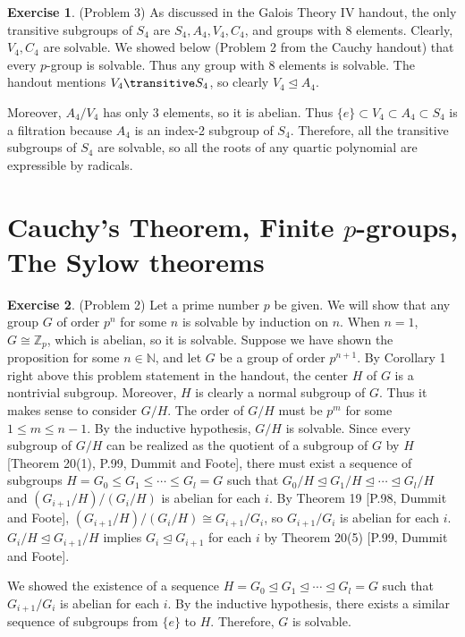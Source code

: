 \documentclass[12pt, psamsfonts]{amsart}
\theoremstyle{definition}
\newtheorem*{exer}{Exercise}
\theoremstyle{remark}
\numberwithin{equation}{section}
\begin{document}
\begin{exer}{(Problem 3)}
  As discussed in the Galois Theory IV handout, the only transitive subgroups of $S_4$ are $S_4, A_4, V_4, C_4$, and groups with 8 elements.
  Clearly, $V_4, C_4$ are solvable.
  We showed below (Problem 2 from the Cauchy handout) that every $p$-group is solvable.
  Thus any group with 8 elements is solvable.
  The handout mentions $V_4 \transitive S_4$, so clearly $V_4 \trianglelefteq A_4$.

  Moreover, $A_4 / V_4$ has only 3 elements, so it is abelian.
  Thus $\{ e \} \subset V_4 \subset A_4 \subset S_4$ is a filtration because $A_4$ is an index-2 subgroup of $S_4$.
  Therefore, all the transitive subgroups of $S_4$ are solvable, so all the roots of any quartic polynomial are expressible by radicals.
\end{exer}

\section{Cauchy's Theorem, Finite $p$-groups, The Sylow theorems}

\begin{exer}{(Problem 2)}
  Let a prime number $p$ be given.
  We will show that any group $G$ of order $p^n$ for some $n$ is solvable by induction on $n$.
  When $n = 1$, $G \cong \mathbb{Z}_p$, which is abelian, so it is solvable.
  Suppose we have shown the proposition for some $n \in \mathbb{N}$, and let $G$ be a group of order $p^{n + 1}$.
  By Corollary 1 right above this problem statement in the handout, the center $H$ of $G$ is a nontrivial subgroup.
  Moreover, $H$ is clearly a normal subgroup of $G$.
  Thus it makes sense to consider $G / H$.
  The order of $G / H$ must be $p^m$ for some $1 \leq m \leq n - 1$.
  By the inductive hypothesis, $G / H$ is solvable.
  Since every subgroup of $G / H$ can be realized as the quotient of a subgroup of $G$ by $H$[Theorem 20(1), P.99, Dummit and Foote], there must exist a sequence of subgroups $H = G_0 \leq G_1 \leq \cdots \leq G_l = G$ such that $G_0 / H \trianglelefteq G_1 / H \trianglelefteq \cdots \trianglelefteq G_l / H$ and $(G_{i + 1} / H) / (G_{i} / H)$ is abelian for each $i$.
  By Theorem 19 [P.98, Dummit and Foote], $(G_{i + 1} / H) / (G_{i} / H) \cong G_{i + 1} / G_{i}$, so $G_{i + 1} / G_i$ is abelian for each $i$.
  $G_i / H \trianglelefteq G_{i + 1} / H$ implies $G_i \trianglelefteq G_{i + 1}$ for each $i$ by Theorem 20(5) [P.99, Dummit and Foote].

  We showed the existence of a sequence $H = G_0 \trianglelefteq G_1 \trianglelefteq \cdots \trianglelefteq G_l = G$ such that $G_{i + 1} / G_i$ is abelian for each $i$.
  By the inductive hypothesis, there exists a similar sequence of subgroups from $\{ e \}$ to $H$.
  Therefore, $G$ is solvable.
\end{exer}
\end{document}
